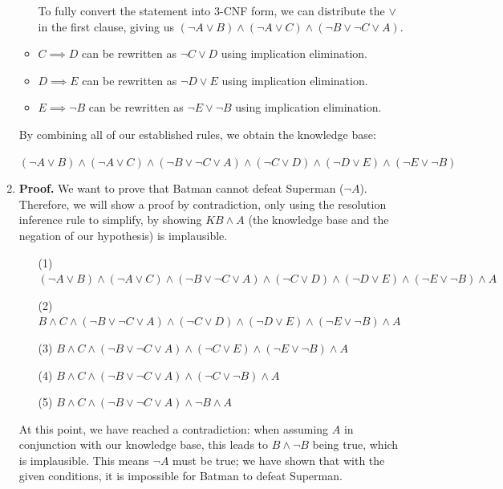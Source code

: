\documentclass[12pt]{article}
\begin{document}
\begin{enumerate}[label=(\alph*)]
\begin{itemize}{}
            To fully convert the statement into 3-CNF form, we can distribute the $\lor$ in the first clause, giving us $(\neg A \lor B) \land (\neg A \lor C) \land (\neg B \lor \neg C \lor A)$.
        
            \item $C \implies D$ can be rewritten as $\neg C \lor D$ using implication elimination.
            \item $D \implies E$ can be rewritten as $\neg D \lor E$ using implication elimination.
            \item $E \implies \neg B$ can be rewritten as $\neg E \lor \neg B$ using implication elimination.
        \end{itemize}
    By combining all of our established rules, we obtain the knowledge base:
    
    $(\neg A \lor B) \land (\neg A \lor C) \land (\neg B \lor \neg C \lor A) \land (\neg C \lor D) \land (\neg D \lor E) \land (\neg E \lor \neg B)$

    \item \textbf{Proof.} We want to prove that Batman cannot defeat Superman ($\neg A$). Therefore, we will show a proof by contradiction, only using the resolution inference rule to simplify, by showing $KB  \land A$ (the knowledge base and the negation of our hypothesis) is implausible.
    \begin{enumerate}
        \item [(1)] $(\neg A \lor B) \land (\neg A \lor C) \land (\neg B \lor \neg C \lor A) \land (\neg C \lor D) \land (\neg D \lor E) \land (\neg E \lor \neg B) \land A$
        \item [(2)] $B \land C \land (\neg B \lor \neg C \lor A) \land (\neg C \lor D) \land (\neg D \lor E) \land (\neg E \lor \neg B) \land A$
        \item [(3)] $B \land C \land (\neg B \lor \neg C \lor A) \land (\neg C \lor E) \land (\neg E \lor \neg B) \land A$
        \item [(4)] $B \land C \land (\neg B \lor \neg C \lor A) \land (\neg C \lor \neg B) \land A$
        \item [(5)] $B \land C \land (\neg B \lor \neg C \lor A) \land \neg B \land A$
    \end{enumerate}
    At this point, we have reached a contradiction: when assuming $A$ in conjunction with our knowledge base, this leads to $B \land \neg B$ being true, which is implausible. This means $\neg A$ must be true; we have shown that with the given conditions, it is impossible for Batman to defeat Superman.
\end{enumerate}
\end{document}
